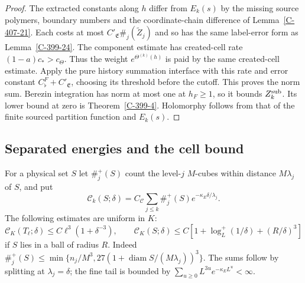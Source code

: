 \documentclass[11pt,letterpaper,reqno]{amsart}
\theoremstyle{definition}
\theoremstyle{remark}
\begin{document}
\begin{proof}
The extracted constants along $h$ differ from $E_k(s)$
by the missing source polymers, boundary numbers and
the coordinate-chain difference of
Lemma~\ref{C-407-21}. Each costs at most
$C'_{\mathfrak E}\#_j(\widetilde Z_j)$ and so has the
same label-error form as Lemma~\ref{C-399-24}.
The component estimate has created-cell rate
$(1-a)c_*>c_\Theta$. Thus the weight $e^{\Theta^{(k)}(h)}$
is paid by the same created-cell estimate. Apply the pure history summation interface
with this rate and error constant
$C_\flat^F+C'_{\mathfrak E}$, choosing its threshold
before the cutoff. This proves the norm sum.
Berezin integration has norm at most one at $h_F\ge1$,
so it bounds $Z_k^{\rm sub}$. Its lower bound at zero
is Theorem~\ref{C-399-4}. Holomorphy follows from that
of the finite sourced partition function and $E_k(s)$.
\end{proof}

\subsection{Separated energies and the cell bound}

For a physical set $S$ let $\#_j^+(S)$ count the level-$j$
$M$-cubes within distance $M\lambda_j$ of $S$, and put
\[
 \mathscr C_k(S;\delta)=C_{\mathscr C}
       \sum_{j\le k}\#_j^+(S)e^{-\kappa_E\delta/\lambda_j}.
\]
The following estimates are uniform in $K$:
\begin{equation}\label{eq:qcd-source-count}
 \mathscr C_K(T_\ell;\delta)\le C\ell^3(1+\delta^{-3}),
 \qquad
 \mathscr C_K(S;\delta)\le
 C[1+\log_L^+(1/\delta)+(R/\delta)^3]
\end{equation}
if $S$ lies in a ball of radius $R$.
Indeed $\#_j^+(S)\le
\min\{n_j/M^3,27(1+\operatorname{diam}S/(M\lambda_j))^3\}$.
The sums follow by splitting at $\lambda_j=\delta$;
the fine tail is bounded by
$\sum_{u\ge0}L^{3u}e^{-\kappa_E L^u}<\infty$.
\end{document}
